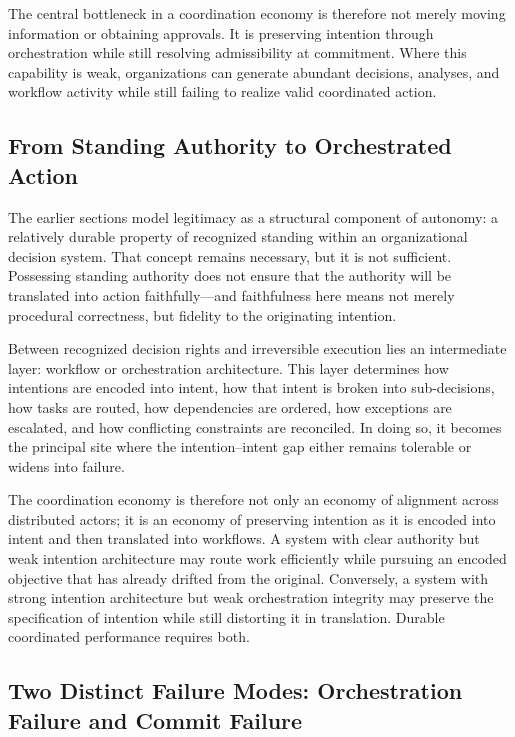 \documentclass[12pt]{article}
\begin{document}
The central bottleneck in a coordination economy is therefore not merely
moving information or obtaining approvals. It is preserving intention through
orchestration while still resolving admissibility at commitment. Where this
capability is weak, organizations can generate abundant decisions, analyses,
and workflow activity while still failing to realize valid coordinated action.

\subsection{From Standing Authority to Orchestrated Action}

The earlier sections model legitimacy as a structural component of autonomy: a
relatively durable property of recognized standing within an organizational
decision system. That concept remains necessary, but it is not sufficient.
Possessing standing authority does not ensure that the authority will be
translated into action faithfully---and faithfulness here means not merely
procedural correctness, but fidelity to the originating intention.

Between recognized decision rights and irreversible execution lies an
intermediate layer: workflow or orchestration architecture. This layer
determines how intentions are encoded into intent, how that intent is broken
into sub-decisions, how tasks are routed, how dependencies are ordered, how
exceptions are escalated, and how conflicting constraints are reconciled. In
doing so, it becomes the principal site where the intention--intent gap either
remains tolerable or widens into failure.

The coordination economy is therefore not only an economy of alignment across
distributed actors; it is an economy of preserving intention as it is encoded
into intent and then translated into workflows. A system with clear authority
but weak intention architecture may route work efficiently while pursuing an
encoded objective that has already drifted from the original. Conversely, a
system with strong intention architecture but weak orchestration integrity may
preserve the specification of intention while still distorting it in
translation. Durable coordinated performance requires both.

\subsection{Two Distinct Failure Modes: Orchestration Failure and Commit Failure}
\end{document}
